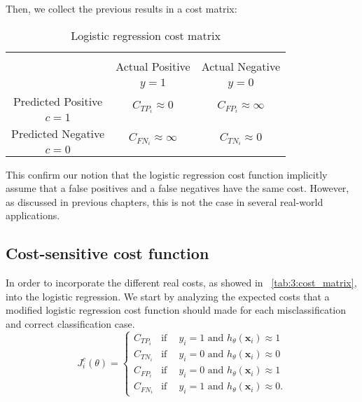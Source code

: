 \noindent Then, we collect the previous results in a cost matrix:
  \begin{table}[htbp]
    \centering
    \footnotesize
    \begin{tabular}{c|c|c}
      \multicolumn{3}{c}{}\\
      \multicolumn{1}{c|}{}  & Actual Positive& Actual Negative \\
      \multicolumn{1}{c|}{} & $y=1$& $y=0$ \\
      \hline
      Predicted Positive    & \multirow{ 2}{*}{$C_{{TP}_i}\approx 0$} & 
      \multirow{2}{*}{$C_{{FP}_i}\approx \infty$} \\
      $c=1$ & &\\
      \hline
      Predicted Negative    & \multirow{ 2}{*}{$C_{{FN}_i}\approx \infty$} & \multirow{ 
      2}{*}{$C_{{TN}_i}\approx 0$} \\
      $c=0$ & &\\
    \end{tabular}
    \caption{Logistic regression cost matrix}
    \label{tab:2:1}
  \end{table} 
  
This confirm our notion that the logistic regression cost function implicitly assume that 
a false positives and a false negatives have the same cost. However, as discussed in previous 
chapters, this is not the case in several real-world applications.

  
\subsection{Cost-sensitive cost function}
\label{sec:7:cscostfunction}

In order to incorporate the different real costs, as showed in 
\tablename{~\ref{tab:3:cost_matrix}}, into the logistic regression. We start by analyzing the 
expected costs that a modified logistic regression cost function should made for each 
misclassification and correct classification case.
\begin{equation*}
  J^c_i(\theta) = 
  \begin{cases}
    C_{TP_i}    & \text{if} \phantom{-}  y_i = 1 \text{ and } h_\theta(\mathbf{x}_i) \approx 1  \\
    C_{TN_i}    & \text{if} \phantom{-}  y_i = 0 \text{ and } h_\theta(\mathbf{x}_i) \approx 0  \\
    C_{FP_i}    & \text{if} \phantom{-}  y_i = 0 \text{ and } h_\theta(\mathbf{x}_i) \approx 1  \\
    C_{FN_i}    & \text{if} \phantom{-}  y_i = 1 \text{ and } h_\theta(\mathbf{x}_i) \approx 0 .
  \end{cases}
\end{equation*}

